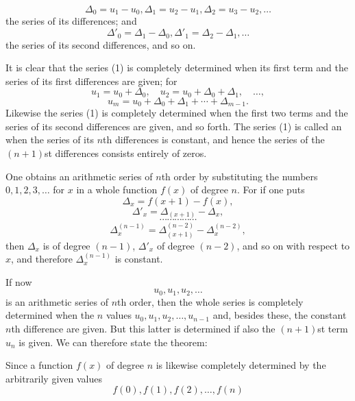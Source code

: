 
\begin{equation}
\Delta_0=u_1-u_0,
 \Delta_1=u_2-u_1,
 \Delta_2=u_3-u_2,\ldots
\tag{2}
\end{equation}
the series of its differences; and
\begin{equation}
 \Delta'_0=\Delta_1-\Delta_0,
 \Delta'_1=\Delta_2-\Delta_1,\ldots
\tag{3}
\end{equation}
the series of its second differences, and so on.

It is clear that the series (1) is completely determined when its first term and the series of its first differences are given; for
\[
 u_1=u_0+\Delta_0,
 \quad u_2=u_0+\Delta_0+\Delta_1,
 \quad\ldots,
\]
\[
 u_m=u_0+\Delta_0+\Delta_1+\cdots+\Delta_{m-1}.
\]
Likewise the series (1) is completely determined when the first two terms and the series of its second differences are given, and so forth. The series (1) is called an  when the series of its $n$th differences is constant, and hence the series of the $(n+1)$st differences consists entirely of zeros.

One obtains an arithmetic series of $n$th order by substituting the numbers $0,1,2,3,\ldots$ for $x$ in a whole function $f(x)$ of degree $n$. For if one puts
\[
 \Delta_x=f(x+1)-f(x),
\]
\[
 \Delta'_x=\Delta_{(x+1)}-\Delta_x,
\]
\[
 \cdots\cdots\cdots\cdots\cdots
\]
\[
 \Delta_x^{(n-1)}=\Delta_{(x+1)}^{(n-2)}-\Delta_x^{(n-2)},
\]
then $\Delta_x$ is of degree $(n-1)$, $\Delta'_x$ of degree $(n-2)$, and so on with respect to $x$, and therefore $\Delta_x^{(n-1)}$ is constant.

If now
\[
 u_0,u_1,u_2,\ldots
\]
is an arithmetic series of $n$th order, then the whole series is completely determined when the $n$ values $u_0,u_1,u_2,\ldots,u_{n-1}$ and, besides these, the constant $n$th difference are given. But this latter is determined if also the $(n+1)$st term $u_n$ is given. We can therefore state the theorem:


Since a function $f(x)$ of degree $n$ is likewise completely determined by the arbitrarily given values
\[
 f(0),f(1),f(2),\ldots,f(n)
\]
